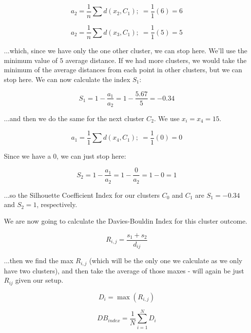 \documentclass{article}
\begin{document}
\begin{equation}
    a_2 = \frac{1}{n} \sum d(x_2, C_1); \; = \frac{1}{1} (6) = 6
\end{equation}

\begin{equation}
    a_2 = \frac{1}{n} \sum d(x_3, C_1); \; = \frac{1}{1} (5) = 5
\end{equation}

\noindent ...which, since we have only the one other cluster, we can stop here. We'll use the minimum value of $5$ average distance. If we had more clusters, we would take the minimum of the average distances from each point in other clusters, but we can stop here. We can now calculate the index $S_1$:

\begin{equation}
    S_1 = 1 - \frac{a_1}{a_2} = 1 - \frac{5.67}{5} = -0.34
\end{equation}

\noindent ...and then we do the same for the next cluster $C_2$. We use $x_i=x_4=15$.

\begin{equation}
    a_1 = \frac{1}{1} \sum d(x_4, C_1); \; = \frac{1}{1} (0) = 0
\end{equation}

Since we have a 0, we can just stop here:

\begin{equation}
    S_2 = 1- \frac{a_1}{a_2} = 1 - \frac{0}{a_2} = 1 - 0 = 1
\end{equation}

\noindent ...so the Silhouette Coefficient Index for our clusters $C_0$ and $C_1$ are $S_1=-0.34$ and $S_2=1$, respectively.


We are now going to calculate the Davies-Bouldin Index for this cluster outcome.

\begin{equation}
    R_{i,j} = \frac{s_1+s_2}{d_{ij}}
\end{equation}

\noindent ...then we find the max $R_{i,j}$ (which will be the only one we calculate as we only have two clusters), and then take the average of those maxes - will again be just $R_{ij}$ given our setup.

\begin{equation}
    D_i = \max(R_{i,j})
\end{equation}

\begin{equation}
    DB_{index} = \frac{1}{N} \sum^N_{i=1} D_i
\end{equation}
\end{document}
